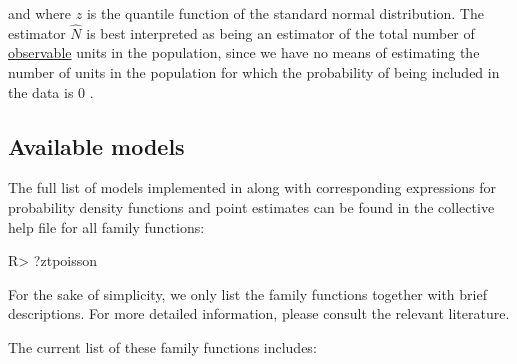 \documentclass[nojss]{jss}
\newcommand{\1}{\mathcal{I}} \newcommand{\bZero}{\boldsymbol{0}}
\begin{document}
and where \(z\) is the quantile function of the standard normal
distribution. The estimator \(\hat{N}\) is best interpreted as being an
estimator of the total number of \underline{observable} units in the
population, since we have no means of estimating the number of units in
the population for which the probability of being included in the data
is \(0\) \citep[cf.][]{ztpoisson}.

\subsection{Available models}\label{available-models}

The full list of models implemented in  along with
corresponding expressions for probability density functions and point
estimates can be found in the collective help file for all family
functions:

\begin{CodeChunk}
\begin{CodeInput}
R> ?ztpoisson
\end{CodeInput}
\end{CodeChunk}

For the sake of simplicity, we only list the family functions together
with brief descriptions. For more detailed information, please consult
the relevant literature.

The current list of these family functions includes:
\end{document}
